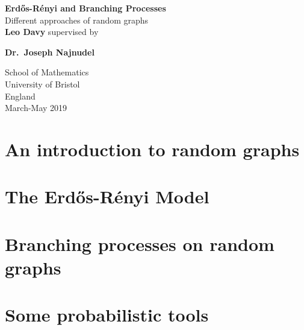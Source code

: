 \documentclass{report}
\theoremstyle{definition}
\begin{document}
\begin{titlepage}
	\begin{center}
		\vspace*{1cm}
		\huge
		\textbf{Erd\H{o}s-R\'enyi and Branching Processes\\}
		\vspace*{0.5cm}
	        \LARGE
		Different approaches of random graphs\\ 
		\vspace{1.5cm}
		\textbf{Leo Davy}
		\vfill				      
	        supervised by\par
		\textbf{Dr.~Joseph Najnudel}
							    
		\vspace{0.8cm}
		
		\Large					  
		School of Mathematics\\
		University of Bristol\\
	        England\\
	        March-May 2019
				      
	\end{center}
\end{titlepage}


\tableofcontents{}

\chapter{An introduction to random graphs}


\chapter{The Erd\H{o}s-R\'enyi Model}


\chapter{Branching processes on random graphs}


%

\appendix

\chapter{Some probabilistic tools}


\printbibliography[heading = bibintoc, title={References}]
\end{document}
